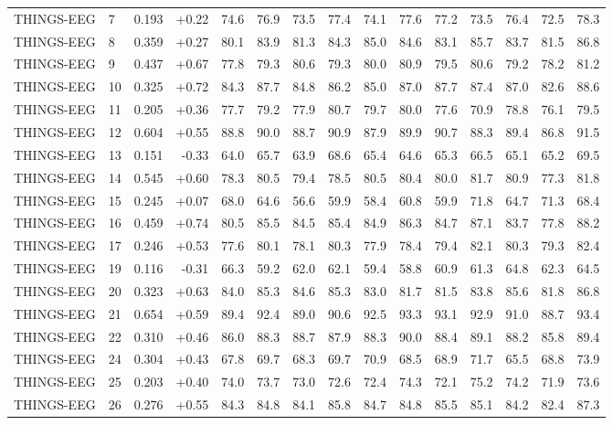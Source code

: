 \begin{longtable}{@{}llrrrrrrrrrrrrr@{}}
THINGS-EEG & 7 & 0.193 & +0.22 & 74.6 & 76.9 & 73.5 & 77.4 & 74.1 & 77.6 & 77.2 & 73.5 & 76.4 & 72.5 & 78.3 \\
THINGS-EEG & 8 & 0.359 & +0.27 & 80.1 & 83.9 & 81.3 & 84.3 & 85.0 & 84.6 & 83.1 & 85.7 & 83.7 & 81.5 & 86.8 \\
THINGS-EEG & 9 & 0.437 & +0.67 & 77.8 & 79.3 & 80.6 & 79.3 & 80.0 & 80.9 & 79.5 & 80.6 & 79.2 & 78.2 & 81.2 \\
THINGS-EEG & 10 & 0.325 & +0.72 & 84.3 & 87.7 & 84.8 & 86.2 & 85.0 & 87.0 & 87.7 & 87.4 & 87.0 & 82.6 & 88.6 \\
THINGS-EEG & 11 & 0.205 & +0.36 & 77.7 & 79.2 & 77.9 & 80.7 & 79.7 & 80.0 & 77.6 & 70.9 & 78.8 & 76.1 & 79.5 \\
THINGS-EEG & 12 & 0.604 & +0.55 & 88.8 & 90.0 & 88.7 & 90.9 & 87.9 & 89.9 & 90.7 & 88.3 & 89.4 & 86.8 & 91.5 \\
THINGS-EEG & 13 & 0.151 & -0.33 & 64.0 & 65.7 & 63.9 & 68.6 & 65.4 & 64.6 & 65.3 & 66.5 & 65.1 & 65.2 & 69.5 \\
THINGS-EEG & 14 & 0.545 & +0.60 & 78.3 & 80.5 & 79.4 & 78.5 & 80.5 & 80.4 & 80.0 & 81.7 & 80.9 & 77.3 & 81.8 \\
THINGS-EEG & 15 & 0.245 & +0.07 & 68.0 & 64.6 & 56.6 & 59.9 & 58.4 & 60.8 & 59.9 & 71.8 & 64.7 & 71.3 & 68.4 \\
THINGS-EEG & 16 & 0.459 & +0.74 & 80.5 & 85.5 & 84.5 & 85.4 & 84.9 & 86.3 & 84.7 & 87.1 & 83.7 & 77.8 & 88.2 \\
THINGS-EEG & 17 & 0.246 & +0.53 & 77.6 & 80.1 & 78.1 & 80.3 & 77.9 & 78.4 & 79.4 & 82.1 & 80.3 & 79.3 & 82.4 \\
THINGS-EEG & 19 & 0.116 & -0.31 & 66.3 & 59.2 & 62.0 & 62.1 & 59.4 & 58.8 & 60.9 & 61.3 & 64.8 & 62.3 & 64.5 \\
THINGS-EEG & 20 & 0.323 & +0.63 & 84.0 & 85.3 & 84.6 & 85.3 & 83.0 & 81.7 & 81.5 & 83.8 & 85.6 & 81.8 & 86.8 \\
THINGS-EEG & 21 & 0.654 & +0.59 & 89.4 & 92.4 & 89.0 & 90.6 & 92.5 & 93.3 & 93.1 & 92.9 & 91.0 & 88.7 & 93.4 \\
THINGS-EEG & 22 & 0.310 & +0.46 & 86.0 & 88.3 & 88.7 & 87.9 & 88.3 & 90.0 & 88.4 & 89.1 & 88.2 & 85.8 & 89.4 \\
THINGS-EEG & 24 & 0.304 & +0.43 & 67.8 & 69.7 & 68.3 & 69.7 & 70.9 & 68.5 & 68.9 & 71.7 & 65.5 & 68.8 & 73.9 \\
THINGS-EEG & 25 & 0.203 & +0.40 & 74.0 & 73.7 & 73.0 & 72.6 & 72.4 & 74.3 & 72.1 & 75.2 & 74.2 & 71.9 & 73.6 \\
THINGS-EEG & 26 & 0.276 & +0.55 & 84.3 & 84.8 & 84.1 & 85.8 & 84.7 & 84.8 & 85.5 & 85.1 & 84.2 & 82.4 & 87.3 \\

\end{longtable}
